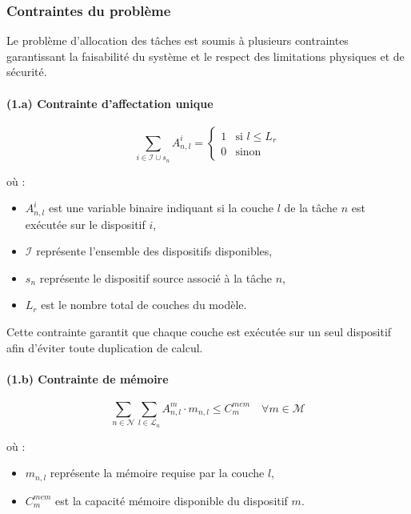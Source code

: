 \documentclass[12pt,a4paper]{report}
\begin{document}
\subsubsection{Contraintes du problème}

Le problème d’allocation des tâches est soumis à plusieurs contraintes garantissant la faisabilité du système et le respect des limitations physiques et de sécurité.

\paragraph{(1.a) Contrainte d’affectation unique}

\begin{equation}
\sum_{i \in \mathcal{I} \cup s_n} A_{n,l}^{i} =
\begin{cases}
1 & \text{si } l \leq L_r \\
0 & \text{sinon}
\end{cases}
\end{equation}

où :
\begin{itemize}
    \item $A_{n,l}^{i}$ est une variable binaire indiquant si la couche $l$ de la tâche $n$ est exécutée sur le dispositif $i$,
    \item $\mathcal{I}$ représente l’ensemble des dispositifs disponibles,
    \item $s_n$ représente le dispositif source associé à la tâche $n$,
    \item $L_r$ est le nombre total de couches du modèle.
\end{itemize}

Cette contrainte garantit que chaque couche est exécutée sur un seul dispositif afin d’éviter toute duplication de calcul.

\paragraph{(1.b) Contrainte de mémoire}

\begin{equation}
\sum_{n \in \mathcal{N}} \sum_{l \in \mathcal{L}_n} A_{n,l}^m \cdot m_{n,l}
\leq C^{mem}_m
\quad \forall m \in \mathcal{M}
\end{equation}

où :
\begin{itemize}
    \item $m_{n,l}$ représente la mémoire requise par la couche $l$,
    \item $C^{mem}_m$ est la capacité mémoire disponible du dispositif $m$.
\end{itemize}
\end{document}
